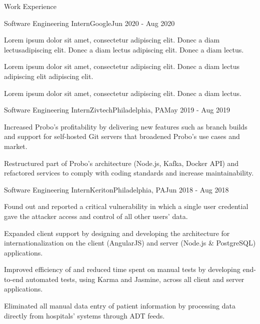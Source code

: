 \documentclass{resume} %
\begin{document}
\begin{rSection}{Work Experience}

\begin{rSubsection}{Software Engineering Intern}{Google}{}{Jun 2020 - Aug 2020}
\item Lorem ipsum dolor sit amet, consectetur adipiscing elit. Donec a diam lectusadipiscing elit. Donec a diam lectus adipiscing elit. Donec a diam lectus.
\item Lorem ipsum dolor sit amet, consectetur adipiscing elit. Donec a diam lectus adipiscing elit adipiscing elit.
\item Lorem ipsum dolor sit amet, consectetur adipiscing elit. Donec a diam lectus.
\end{rSubsection}


\begin{rSubsection}{Software Engineering Intern}{Zivtech}{Philadelphia, PA}{May 2019 - Aug 2019}
\item Increased Probo's profitability by delivering new features such as branch builds and support for self-hosted Git servers that broadened Probo’s use cases and market.
\item Restructured part of Probo's architecture (Node.js, Kafka, Docker API) and refactored services to comply with coding standards and increase maintainability.
\end{rSubsection}


\begin{rSubsection}{Software Engineering Intern}{Keriton}{Philadelphia, PA}{Jun 2018 - Aug 2018}
\item Found out and reported a critical vulnerability in which a single user credential gave the attacker access and control of all other users' data.
\item Expanded client support by designing and developing the architecture for internationalization on the client (AngularJS) and server (Node.js \& PostgreSQL) applications.
\item Improved efficiency of and reduced time spent on manual tests by developing end-to-end automated tests, using Karma and Jasmine, across all client and server applications.
\item Eliminated all manual data entry of patient information by processing data directly from hospitals' systems through ADT feeds.
\end{rSubsection}

\end{rSection}
\end{document}
